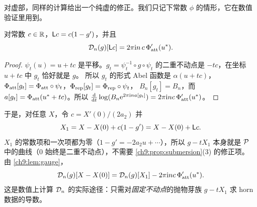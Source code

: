对虚部，同样的计算给出一个纯虚的修正。我们只记下常数 $\phi$ 的情形，它在数值验证里用到。

\begin{lemma}[基点规范]\label{ch9:lem:gauge}
对常数 $c\in\mathbb{R}$，$\mathsf L c=c(1-g')$，并且
\[
 \mathcal D_n(g)[\mathsf L c]=2\pi\mathrm{i} n\,c\,\Phi_{\mathrm{att}}'(u^{*}) .
\]
\end{lemma}

\begin{proof}
$\psi_t(u)=u+tc$ 是平移。$g_t=\psi_t^{-1}\circ g\circ\psi_t$ 的二重不动点是 $-tc$，在坐标 $u+tc$ 中 $g_t$ 恰好就是 $g$。
所以 $g_t$ 的形式 Abel 函数是 $\alpha(u+tc)$，$\Phi_{\mathrm{att}}[g_t]=\Phi_{\mathrm{att}}\circ\psi_t$，$\Phi_{\mathrm{rep}}[g_t]=\Phi_{\mathrm{rep}}\circ\psi_t$，
$B_n[g_t]=B_n$，而 $a[g_t]=\Phi_{\mathrm{att}}(u^{*}+tc)$。所以 $\frac{\mathrm{d}}{\mathrm{d} t}\log(B_n\mathrm{e}^{2\pi\mathrm{i} na[g_t]})=2\pi\mathrm{i} nc\,\Phi_{\mathrm{att}}'(u^{*})$。
\end{proof}

于是，对任意 $X$，令 $c=X'(0)/(2a_2)$ 并
\begin{equation}\label{ch9:eq:X1}
 X_1=X-X(0)+c(1-g')=X-X(0)+\mathsf L c .
\end{equation}
$X_1$ 的常数项和一次项都为零（$1-g'=-2a_2u+\cdots$），所以 $g-tX_1$ 本身就是 $\mathcal P$ 中的曲线（$0$ 始终是二重不动点），不需要 \cref{ch9:prop:submersion}(3) 的修正项。
由 \cref{ch9:lem:gauge}，
\begin{equation}\label{ch9:eq:split}
 \mathcal D_n(g)[X-X(0)]=\mathcal D_n(g)[X_1]-2\pi\mathrm{i} nc\,\Phi_{\mathrm{att}}'(u^{*}) .
\end{equation}
这是数值上计算 $\mathcal D_n$ 的实际途径：只需对\emph{固定不动点}的抛物芽族 $g-tX_1$ 求 horn 数据的导数。

